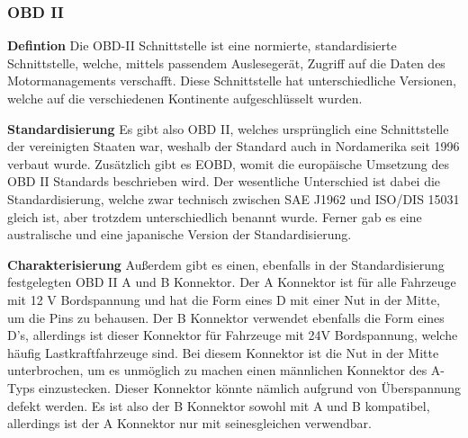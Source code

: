 \subsubsection{OBD II}
\label{subsec:obd2}

\textbf{Defintion\nextline}
Die OBD-II Schnittstelle ist eine normierte, standardisierte Schnittstelle, welche, mittels passendem Auslesegerät, Zugriff auf die Daten des Motormanagements verschafft. Diese Schnittstelle hat unterschiedliche Versionen, welche auf die verschiedenen Kontinente aufgeschlüsselt wurden. 

\textbf{Standardisierung\nextline}
Es gibt also OBD II, welches ursprünglich eine Schnittstelle der vereinigten Staaten war, weshalb der Standard auch in Nordamerika seit 1996 verbaut wurde. Zusätzlich gibt es EOBD, womit die europäische Umsetzung des OBD II Standards beschrieben wird.\cite{SIMR.CH2-obd2.EUP-D98/69/EC} Der wesentliche Unterschied ist dabei die Standardisierung, welche zwar technisch zwischen SAE J1962 und ISO/DIS 15031 gleich ist, aber trotzdem unterschiedlich benannt wurde. \cite{SIMR.CH2-obd2.SAEJ1962} Ferner gab es eine australische \cite{SIMR.CH2-obd2.AU-MVSA1989} und eine japanische Version der Standardisierung.

\textbf{Charakterisierung\nextline}
Außerdem gibt es einen, ebenfalls in der Standardisierung festgelegten OBD II A und B Konnektor. Der A Konnektor ist für alle Fahrzeuge mit 12 V Bordspannung und hat die Form eines D mit einer Nut in der Mitte, um die Pins zu behausen. Der B Konnektor verwendet ebenfalls die Form eines D's, allerdings ist dieser Konnektor für Fahrzeuge mit 24V Bordspannung, welche häufig Lastkraftfahrzeuge sind. Bei diesem Konnektor ist die Nut in der Mitte unterbrochen, um es unmöglich zu machen einen männlichen Konnektor des A-Typs einzustecken. Dieser Konnektor könnte  nämlich aufgrund von Überspannung defekt werden. Es ist also der B Konnektor sowohl mit A und B kompatibel, allerdings ist der A Konnektor nur mit seinesgleichen verwendbar.

